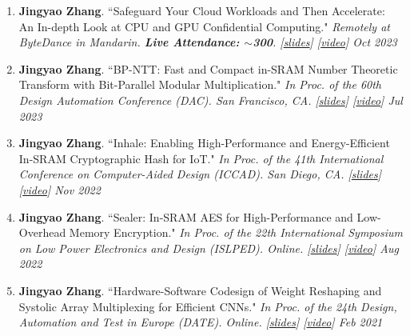 \documentclass[letterpaper,11pt]{article}
\begin{document}
\begin{enumerate}[leftmargin=*, labelindent=12pt, label=\arabic*., topsep=0pt, partopsep=0pt, parsep=0pt, itemsep=3pt]
        \item \textbf{Jingyao Zhang}. ``Safeguard Your Cloud Workloads and Then Accelerate: An In-depth Look at CPU and GPU Confidential Computing." \textit{Remotely at ByteDance in Mandarin. \textbf{Live Attendance: $\sim$300}. \emph{[\href{https://jingyao-zhang.github.io/slides/ByteDance-Tech-Talk-Slides.pdf}{slides}] [\href{https://bytedance.feishu.cn/minutes/obcn35p3vg153yhg211a9jl8?from=auth_notice}{video}]}
        \hfill Oct 2023} \vspace{-2pt}
        \item \textbf{Jingyao Zhang}. ``BP-NTT: Fast and Compact in-SRAM Number Theoretic Transform with Bit-Parallel Modular Multiplication." \textit{In Proc. of the 60th Design Automation Conference (DAC). San Francisco, CA. 
        \emph{[\href{https://jingyao-zhang.github.io/slides/DAC-2023-Slides.pdf}{slides}]
        [\href{https://www.youtube.com/watch?v=iCul63P_v2E}{video}]}
        \hfill Jul 2023} \vspace{-2pt}
        \item \textbf{Jingyao Zhang}. ``Inhale: Enabling High-Performance and Energy-Efficient In-SRAM Cryptographic Hash for IoT." \textit{In Proc. of the 41th International Conference on Computer-Aided Design (ICCAD). San Diego, CA. 
        \emph{[\href{https://jingyao-zhang.github.io/slides/ICCAD-2022-Slides.pdf}{slides}]
        [\href{https://www.youtube.com/watch?v=e3KeH8AqGks}{video}]}
        \hfill Nov 2022} \vspace{-2pt}
        \item \textbf{Jingyao Zhang}. ``Sealer: In-SRAM AES for High-Performance and Low-Overhead Memory Encryption." \textit{In Proc. of the 22th International Symposium on Low Power Electronics and Design (ISLPED). Online.
        \emph{[\href{https://jingyao-zhang.github.io/slides/ISLPED-2022-Slides.pdf}{slides}]
        [\href{https://www.youtube.com/watch?v=mBx0Q7_Zk8c}{video}]}
        \hfill Aug 2022} \vspace{-2pt}
        \item \textbf{Jingyao Zhang}. ``Hardware-Software Codesign of Weight Reshaping and Systolic Array Multiplexing for Efficient CNNs." \textit{In Proc. of the 24th Design, Automation and Test in Europe (DATE). Online.
        \emph{[\href{https://jingyao-zhang.github.io/slides/DATE-2021-Slides.pdf}{slides}]
        [\href{https://www.youtube.com/watch?v=HiyUaztZrys}{video}]}
        \hfill Feb 2021} \vspace{-2pt}
        \end{enumerate}
        
\end{document}
